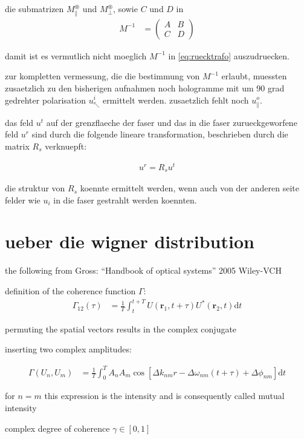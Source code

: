 \documentclass{article}
\newcommand{\vect}[1]{\mathbf{#1}}
\renewcommand{\r}{\vect r}
\begin{document}
die submatrizen $M^\circledast_\parallel$ und $M^\circledast_\perp$,
sowie $C$ und $D$ in
\begin{align}
  M^{-1} &=\begin{pmatrix}
    A & B \\ C& D
  \end{pmatrix}
\end{align}

damit ist es vermutlich nicht moeglich $M^{-1}$ in
\eqref{eq:ruecktrafo} auszudruecken.

zur kompletten vermessung, die die bestimmung von $M^{-1}$ erlaubt,
muessten zusaetzlich zu den bisherigen aufnahmen noch hologramme mit
um 90 grad gedrehter polarisation $u^i_\nwarrow$ ermittelt
werden. zusaetzlich fehlt noch $u^o_\parallel$.

das feld $u^t$ auf der grenzflaeche der faser und das in die faser
zurueckgeworfene feld $u^r$ sind durch die folgende lineare
transformation, beschrieben durch die matrix $R_s$ verknuepft:

\begin{align}
  u^r = R_s u^t
\end{align}

die struktur von $R_s$ koennte ermittelt werden, wenn auch von der
anderen seite felder wie $u_i$ in die faser gestrahlt werden koennten.

\section{ueber die wigner distribution}
the following from Gross: ``Handbook of optical systems'' 2005 Wiley-VCH

definition of the coherence function $\Gamma$:
\begin{align}
  \Gamma_{12}(\tau) &= \frac{1}{T}\int_t^{t+T} U(\r_1,t+\tau) U^*(\r_2,t)\textrm{d}t
\end{align}

permuting the spatial vectors results in the complex conjugate

inserting two complex amplitudes:

\begin{align}
  \Gamma(U_n, U_m) &= \frac{1}{T}\int_0^T A_n A_m \cos\left[ \Delta k_{nm} r -\Delta\omega_{nm}(t+\tau) + \Delta\phi_{nm} \right]\textrm{d}t
\end{align}

for $n=m$ this expression is the intensity and is consequently called mutual intensity

complex degree of coherence $\gamma\in[0,1]$
\end{document}
